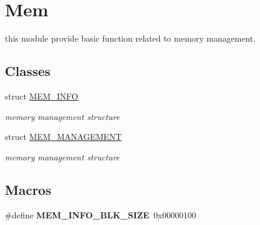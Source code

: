 \hypertarget{group__mem}{}\section{Mem}
\label{group__mem}


this module provide basic function related to memory management.  


\subsection*{Classes}
\begin{DoxyCompactItemize}
\item 
struct \hyperlink{struct_m_e_m___i_n_f_o}{M\+E\+M\+\_\+\+I\+N\+F\+O}
\begin{DoxyCompactList}\small\item\em memory management structure \end{DoxyCompactList}\item 
struct \hyperlink{struct_m_e_m___m_a_n_a_g_e_m_e_n_t}{M\+E\+M\+\_\+\+M\+A\+N\+A\+G\+E\+M\+E\+N\+T}
\begin{DoxyCompactList}\small\item\em memory management structure \end{DoxyCompactList}\end{DoxyCompactItemize}
\subsection*{Macros}
\begin{DoxyCompactItemize}
\item 
\hypertarget{group__mem_ga93fd439f0a488f606180d5b9a9371c40}{}\#define {\bfseries M\+E\+M\+\_\+\+I\+N\+F\+O\+\_\+\+B\+L\+K\+\_\+\+S\+I\+Z\+E}~0x00000100\label{group__mem_ga93fd439f0a488f606180d5b9a9371c40}

\end{DoxyCompactItemize}
